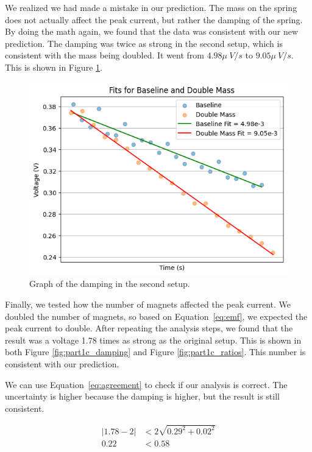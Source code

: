 \documentclass[11pt]{article}
\begin{document}
    We realized we had made a mistake in our prediction.
    The mass on the spring does not actually affect the peak current, but rather the damping of the spring.
    By doing the math again, we found that the data was consistent with our new prediction.
    The damping was twice as strong in the second setup, which is consistent with the mass being doubled.
    It went from $4.98 \mu~V/s $ to $9.05 \mu~V/s$.
    This is shown in Figure \ref{fig:part1b_fits}.

    \begin{figure}[H]
        \centering
        \includegraphics[width=0.8\linewidth]{resources/images/part1b fits}
        \caption{Graph of the damping in the second setup.}
        \label{fig:part1b_fits}
    \end{figure}

    Finally, we tested how the number of magnets affected the peak current.
    We doubled the number of magnets, so based on Equation~\ref{eq:emf}, we expected the peak current to double.
    After repeating the analysis steps, we found that the result was a voltage 1.78 times as strong as the original setup.
    This is shown in both Figure \ref{fig:part1c_damping} and Figure \ref{fig:part1c_ratios}.
    This number is consistent with our prediction.

    We can use Equation~\ref{eq:agreement} to check if our analysis is correct.
    The uncertainty is higher because the damping is higher, but the result is still consistent.

    \begin{align*}
        |1.78 - 2| &< 2 \sqrt{0.29^2 + 0.02^2} \\
        0.22 &< 0.58
    \end{align*}
\end{document}
